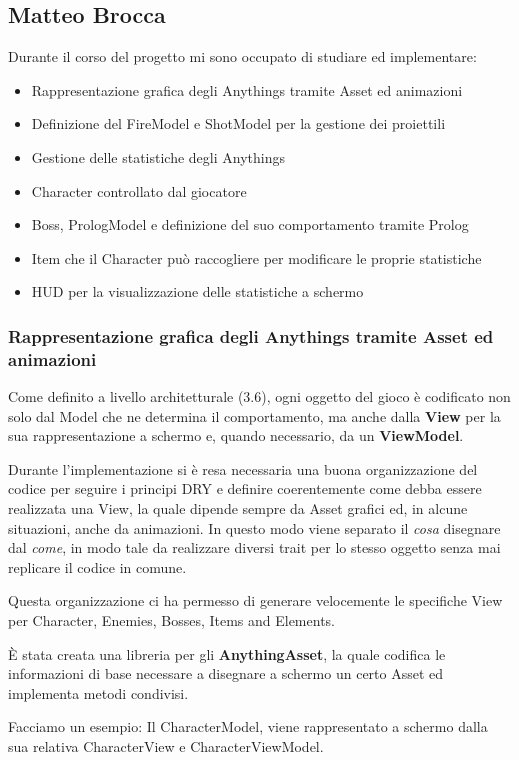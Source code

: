 \subsection{Matteo Brocca}
Durante il corso del progetto mi sono occupato di studiare ed implementare:
\begin{itemize}
	\item Rappresentazione grafica degli Anythings tramite Asset ed animazioni
    \item Definizione del FireModel e ShotModel per la gestione dei proiettili
    \item Gestione delle statistiche degli Anythings
    \item Character controllato dal giocatore
    \item Boss, PrologModel e definizione del suo comportamento tramite Prolog
    \item Item che il Character può raccogliere per modificare le proprie statistiche
    \item HUD per la visualizzazione delle statistiche a schermo
\end{itemize}

\subsubsection{Rappresentazione grafica degli Anythings tramite Asset ed animazioni}
Come definito a livello architetturale (3.6), ogni oggetto del gioco è codificato non solo dal Model che ne determina il comportamento,
ma anche dalla \textbf{View} per la sua rappresentazione a schermo e, quando necessario, da un \textbf{ViewModel}.

Durante l'implementazione si è resa necessaria una buona organizzazione del codice per seguire i principi DRY 
e definire coerentemente come debba essere realizzata una View, la quale dipende sempre da Asset grafici 
ed, in alcune situazioni, anche da animazioni. In questo modo viene separato il \textit{cosa} disegnare dal \textit{come}, 
in modo tale da realizzare diversi trait per lo stesso oggetto senza mai replicare il codice in comune.

Questa organizzazione ci ha permesso di generare velocemente le specifiche View per Character, Enemies, Bosses, Items and Elements.

È stata creata una libreria per gli \textbf{AnythingAsset}, la quale codifica le informazioni di base necessare  a disegnare a schermo un certo Asset ed implementa metodi condivisi.

Facciamo un esempio:
Il CharacterModel, viene rappresentato a schermo dalla sua relativa CharacterView e CharacterViewModel.

